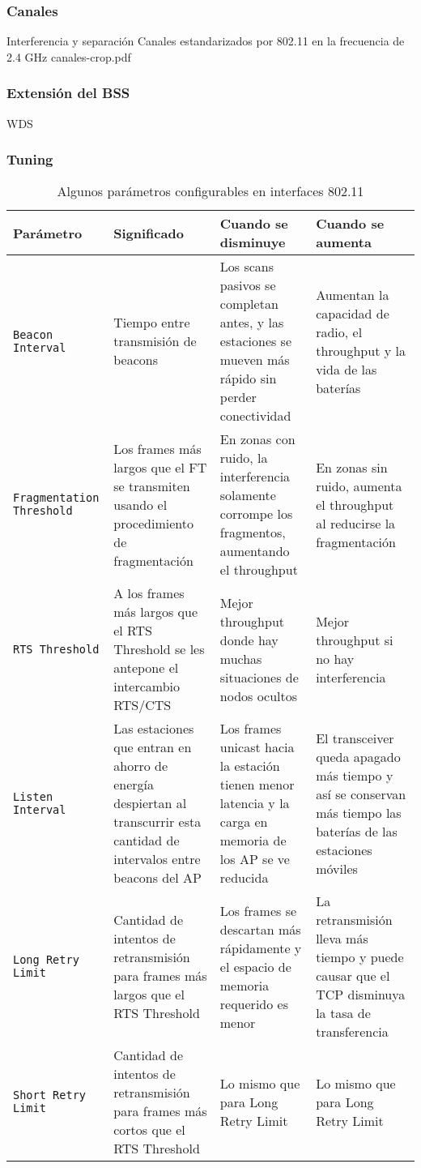 \subsubsection{Canales}
Interferencia y separación
 {Canales estandarizados por 802.11 en la frecuencia de 2.4 GHz} {canales-crop.pdf}
\subsubsection{Extensión del BSS}
WDS

\subsubsection{Tuning}


\begin{table}
\scriptsize
\parindent=0pt
\hrulefill
\begin{tabular}{   |p{} |
                   p{} |
                   p{} |
                   p{} | }
\hline
Parámetro 	& Significado  & Cuando se disminuye & Cuando se aumenta \\
\hline
\texttt{Beacon Interval}&Tiempo entre transmisión de beacons&Los scans pasivos se completan antes, y las estaciones se mueven más rápido sin perder conectividad
& Aumentan la capacidad de radio, el throughput y la vida de las baterías\\
\hline
\texttt{Fragmentation Threshold}&Los frames más largos que el FT se transmiten usando el procedimiento de fragmentación&En zonas con ruido, la interferencia solamente corrompe los fragmentos, aumentando el throughput&En zonas sin ruido, aumenta el throughput al reducirse la fragmentación \\
\hline
\texttt{RTS Threshold}&A los frames más largos que el RTS Threshold se les antepone el intercambio RTS/CTS&Mejor throughput donde hay muchas situaciones de nodos ocultos&Mejor throughput si no hay interferencia\\
\hline
\texttt{Listen Interval}&Las estaciones que entran en ahorro de energía despiertan al transcurrir esta cantidad de intervalos entre beacons del AP&Los frames unicast hacia la estación tienen menor latencia y la carga en memoria de los AP se ve reducida&El transceiver queda apagado más tiempo y así se conservan más tiempo las baterías de las estaciones móviles\\
\hline
\texttt{Long Retry Limit}&Cantidad de intentos de retransmisión para frames más largos que el RTS Threshold&Los frames se descartan más rápidamente y el espacio de memoria requerido es menor&La retransmisión lleva más tiempo y puede causar que el TCP disminuya la tasa de transferencia \\
\hline
\texttt{Short Retry Limit}&Cantidad de intentos de retransmisión para frames más cortos que el RTS Threshold&Lo mismo que para Long Retry Limit&Lo mismo que para Long Retry Limit \\
\hline
\end{tabular}
\caption{Algunos parámetros configurables en interfaces 802.11}
\label{tab:tuning}
\end{table}
